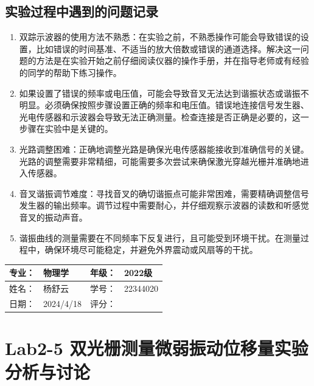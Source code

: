 \documentclass[dvipsnames, svgnames,a4paper,11pt]{article}
\begin{document}
	\subsection{实验过程中遇到的问题记录}
	\begin{enumerate}
		\item 双踪示波器的使用方法不熟悉：在实验之前，不熟悉操作可能会导致错误的设置，比如错误的时间基准、不适当的放大倍数或错误的通道选择。解决这一问题的方法是在实验开始之前仔细阅读仪器的操作手册，并在指导老师或有经验的同学的帮助下练习操作。
		
		\item 如果设置了错误的频率或电压值，可能会导致音叉无法达到谐振状态或谐振不明显。必须确保按照步骤设置正确的频率和电压值。错误地连接信号发生器、光电传感器和示波器会导致无法正确测量。检查连接是否正确是必要的，这一步骤在实验中是关键的。
		
		\item 光路调整困难：正确地调整光路是确保光电传感器能接收到准确信号的关键。光路的调整需要非常精细，可能需要多次尝试来确保激光穿越光栅并准确地进入传感器。
		
		\item 音叉谐振调节难度：寻找音叉的确切谐振点可能非常困难，需要精确调整信号发生器的输出频率。调节过程中需要耐心，并仔细观察示波器的读数和听感觉音叉的振动声音。
		
		\item 谐振曲线的测量需要在不同频率下反复进行，且可能受到环境干扰。在测量过程中，确保环境尽可能稳定，并避免外界震动或风扇等的干扰。
	\end{enumerate}
	
	
	
	\clearpage
	
	\begin{table}
		\renewcommand\arraystretch{1.7}
		\begin{tabularx}{\textwidth}{|X|X|X|X|}
			\hline
			专业：& 物理学 &年级：& 2022级\\
			\hline
			姓名： & 杨舒云 & 学号：& 22344020\\
			\hline
			日期：& 2024/4/18 & 评分： &\\
			\hline
		\end{tabularx}
	\end{table}
	
	\section{Lab2-5 双光栅测量微弱振动位移量实验 \quad\heiti 分析与讨论}
	
\end{document}
